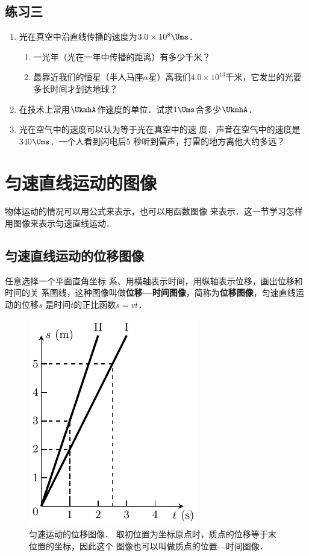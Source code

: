 \subsection*{练习三}

\begin{enumerate}
    \item 光在真空中沿直线传播的速度为$3.0\times 10^8\Ums$．
\begin{enumerate}
    \item 一光年（光在一年中传播的距离）有多少千米？
    \item 最靠近我们的恒星（半人马座$\alpha$星）离我们$4.0\times 10^{13}$千米，它发出的光要多长时间才到达地球？
\end{enumerate}    
\item  在技术上常用$\UkmhA$作速度的单位．试求$1 \Ums$合多少$\UkmhA$．
\item 光在空气中的速度可以认为等于光在真空中的速
度．声音在空气中的速度是340$\Ums$．一个人看到闪电后5
秒听到雷声，打雷的地方离他大约多远？

\end{enumerate}

\section{匀速直线运动的图像}
    物体运动的情况可以用公式来表示，也可以用函数图像
来表示．这一节学习怎样用图像来表示匀速直线运动．

    \subsection{匀速直线运动的位移图像} 
    
    任意选择一个平面直角坐标
系、用横轴表示时间，用纵轴表示位移，画出位移和时间的关
系图线，这种图像叫做\textbf{位移—时间图像}，简称为\textbf{位移图像}，匀速直线运动的位移$s$
是时间$t$的正比函数$s=vt$．
\begin{figure}[htp]
    \centering
    \includegraphics{fig/A/2-8.pdf}
    \caption{匀速运动的位移图像．
    取初位置为坐标原点时，质点的位移等于末位置的坐标，因此这个
    图像也可以叫做质点的位置—时间图像．}\label{fig_A_2-8}
\end{figure}

